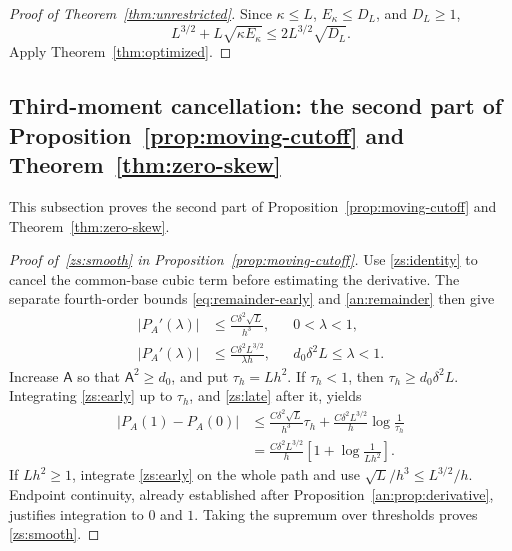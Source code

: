 \documentclass[11pt,letterpaper]{article}
\newif\ifshowrev
\newcommand{\rev}[1]{\ifshowrev{\color{revblue}%
\hypersetup{linkcolor=revblue,citecolor=revblue,urlcolor=revblue}#1}\else#1\fi}
\newcommand{\rs}[1]{\ifshowrev{\color{revblue}#1}\else#1\fi}
\newcommand{\Ac}{\rs{\mathsf A}}
\newif\ifshowtrim
\newcommand{\trim}[1]{\ifshowtrim{\color{revblue}%
\hypersetup{linkcolor=revblue,citecolor=revblue,urlcolor=revblue}#1}\else#1\fi}
\newif\ifshowskill
\newcommand{\sks}[1]{\ifshowskill{\color{revblue}#1}\else#1\fi}
\theoremstyle{remark}
\begin{document}
\begin{proof}[Proof of Theorem~\ref{thm:unrestricted}]
Since \(\kappa\le L\), \(E_\kappa\le D_L\), and \(D_L\ge1\),
\[
 L^{3/2}+L\sqrt{\kappa E_\kappa}
 \le 2L^{3/2}\sqrt{D_L}.
\]
Apply Theorem~\ref{thm:optimized}.
\end{proof}


\subsection{\texorpdfstring{\sks{Third-moment cancellation: the second part of Proposition~\ref{prop:moving-cutoff} and Theorem~\ref{thm:zero-skew}}}{Third-moment cancellation: the second part of Proposition 2 and Theorem 3}}\label{zs:section}
\trim{This subsection proves the second part of
Proposition~\ref{prop:moving-cutoff} and Theorem~\ref{thm:zero-skew}.}

\begin{proof}[\rev{Proof of~\eqref{zs:smooth} in
Proposition~\ref{prop:moving-cutoff}}]
Use \eqref{zs:identity} to cancel the common-base cubic term before
estimating the derivative. The separate fourth-order bounds
\eqref{eq:remainder-early} and \eqref{an:remainder} then give
\begin{align}
 |P_A'(\lambda)|
 &\le \frac{C\delta^2\sqrt L}{h^3},
 &&0<\lambda<1,\label{zs:early}\\
 |P_A'(\lambda)|
 &\le \frac{C\delta^2L^{3/2}}{\lambda h},
 &&d_0\delta^2L\le\lambda<1.\label{zs:late}
\end{align}
Increase \(\Ac\) so that \(\Ac^2\ge d_0\), and put \(\tau_h=Lh^2\).
If \(\tau_h<1\), then \(\tau_h\ge d_0\delta^2L\). Integrating
\eqref{zs:early} up to \(\tau_h\), and \eqref{zs:late} after it,
yields
\begin{align*}
 |P_A(1)-P_A(0)|
 &\le \frac{C\delta^2\sqrt L}{h^3}\tau_h
       +\frac{C\delta^2L^{3/2}}h\log\frac1{\tau_h}\\
 &=\frac{C\delta^2L^{3/2}}h
       \left[1+\log\frac1{Lh^2}\right].
\end{align*}
If \(Lh^2\ge1\), integrate \eqref{zs:early} on the whole path and
use \(\sqrt L/h^3\le L^{3/2}/h\). Endpoint continuity, already
established after Proposition~\ref{an:prop:derivative}, justifies
integration to \(0\) and \(1\). Taking the supremum over thresholds
proves \eqref{zs:smooth}.
\end{proof}
\end{document}
